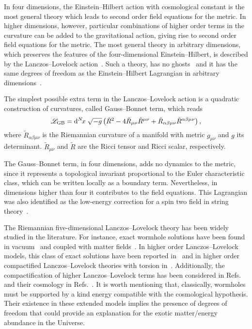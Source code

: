 \documentclass[aps,prd,12pt,superscriptaddress,showpacs,showkeys,longbibliography,reprint,nofootinbib]{revtex4-1}
\begin{document}
In four dimensions, the Einstein--Hilbert action with cosmological constant is the most general theory which leads to second order field equations for the metric. In higher dimensions, however, particular combinations of higher order terms in the curvature can be added to the gravitational action, giving rise to second order field equations for the metric. The most general theory in arbitrary dimensions, which preserves the features of the four-dimensional Einstein--Hilbert, is described by the Lanczos--Lovelock action~\cite{Lanczos:1938sf,*Lovelock:1971yv}. Such a theory, has no ghosts~\cite{Zumino:1985dp} and it has the same degrees of freedom as the Einstein--Hilbert Lagrangian in arbitrary dimensions~\cite{Henneaux:1990au}.

The simplest possible extra term in the Lanczos--Lovelock action  is a quadratic construction of curvatures, called Gauss--Bonnet term, which reads
\begin{equation}\label{GB}
  \mathcal{L}_{\mathrm{GB}} = {\mathrm{d}}^{N}\!{x}\;\sqrt{-g}\left(\tilde{R}^2-4\tilde{R}_{\mu\nu}\tilde{R}^{\mu\nu}+\tilde{R}_{\alpha\beta\mu\nu}
  \tilde{R}^{\alpha\beta\mu\nu}\right),
\end{equation}
where $\tilde{R}_{\alpha\beta\mu\nu}$ is the Riemannian curvature of a manifold with metric $g_{\mu\nu}$ and $g$ its determinant. $\tilde{R}_{\mu\nu}$ and $\tilde{R}$ are the Ricci tensor and Ricci scalar, respectively.

The Gauss--Bonnet term, in four dimensions, adds no dynamics to the metric, since it represents a topological invariant proportional to the Euler characteristic class, which can be written locally as a boundary term. Nevertheless, in dimensions higher than four it contributes to the field equations. This Lagrangian was also identified as the low-energy correction for a spin two field in string theory~\cite{Zwiebach:1985uq}.

The Riemannian five-dimensional Lanczos--Lovelock theory has been widely studied in the literature. For instance, exact wormhole solutions have been found in vacuum~\cite{Dotti:2006cp,*Dotti:2007az} and coupled with matter fields~\cite{Mehdizadeh:2015jra}. In higher order Lanczos--Lovelock models, this class of exact solutions have been reported in~\cite{Mehdizadeh:2015dta} and in higher order compactified Lanczos--Lovelock theories with torsion in~\cite{Canfora:2008ka}. Additionally, the compactification of higher Lanczos--Lovelock terms has been considered in Refs.~\cite{MuellerHoissen:1985mm,*MuellerHoissen:1989yv} and their cosmology in Refs.~\cite{MuellerHoissen:1985ij,Deruelle:1986iv,Deruelle:1989fj}. It is worth mentioning that, classically, wormholes must be supported by a kind energy compatible with the cosmological hypothesis. Their existence in these extended models implies the presence of degrees of freedom that could provide an explanation for the exotic matter/energy abundance in the Universe.  
\end{document}

